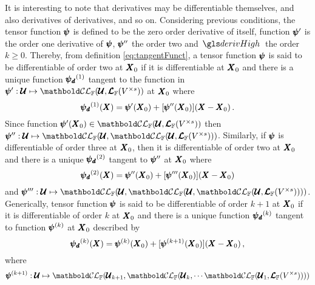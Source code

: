 It is interesting to note that derivatives may be differentiable themselves, and also derivatives of derivatives, and so on. Considering previous conditions, the tensor function $\pmb{\psi}$ is defined to be the zero order derivative of itself, function $\pmb{\psi}'$ is the order one derivative of $\pmb{\psi}$, $\pmb{\psi}''$ the order two and $\gloref{derivHigh}$ the order $k\geqslant 0$. Thereby, from definition \eqref{eq:tangentFunct}, a tensor function $\pmb{\psi}$ is said to be differentiable of order two at $\pmb{X}_0$ if it is differentiable at $\pmb{X}_0$ and there is a unique function $\pmb{\psi_\mathit{d}}^{(1)}$ tangent to the function in $\map{\tnr{\psi}'}{\pmb{\mathcal{U}}}{\evlc{\cam{F}}{\pmb{\mathcal{U}}}{\ete{\cam{F}}{V^{\times s}}}}$ at $\pmb{X}_0$ where
\begin{equation*}
\pmb{\psi_\mathit{d}}^{(1)}(\pmb{X})=\pmb{\psi}'(\pmb{X}_0)+[\pmb{\psi}''(\pmb{X}_0)](\pmb{X}-\pmb{X}_0)\,.
\end{equation*}
Since function $\fua{\tnr{\psi}'}{\tnr{X}_0}\in\evlc{\cam{F}}{\pmb{\mathcal{U}}}{\ete{\cam{F}}{V^{\times s}}}$ then  $\map{\tnr{\psi}''}{\pmb{\mathcal{U}}}{\evlc{\cam{F}}{\pmb{\mathcal{U}}}{\evlc{\cam{F}}{\pmb{\mathcal{U}}}{\ete{\cam{F}}{V^{\times s}}}}}$. Similarly, if $\pmb{\psi}$ is differentiable of order three at $\pmb{X}_0$, then it is differentiable of order two at $\pmb{X}_0$ and there is a unique $\pmb{\psi_\mathit{d}}^{(2)}$ tangent to $\pmb{\psi}''$ at $\pmb{X}_0$ where
\begin{equation*}
\pmb{\psi_\mathit{d}}^{(2)}(\pmb{X})=\pmb{\psi}''(\pmb{X}_0)+[\pmb{\psi}'''(\pmb{X}_0)](\pmb{X}-\pmb{X}_0)
\end{equation*}
and $\map{\tnr{\psi}'''}{\pmb{\mathcal{U}}}{\evlc{\cam{F}}{\pmb{\mathcal{U}}}{\evlc{\cam{F}}{\pmb{\mathcal{U}}}{\evlc{\cam{F}}{\pmb{\mathcal{U}}}{\ete{\cam{F}}{V^{\times s}}}}}}$. Generically, tensor function $\pmb{\psi}$ is said to be differentiable of order $k+1$ at $\pmb{X}_0$ if it is differentiable of order $k$ at $\pmb{X}_0$ and there is a unique function $\pmb{\psi_\mathit{d}}^{(k)}$ tangent to function $\pmb{\psi}^{(k)}$ at $\pmb{X}_0$ described by
\begin{equation}\label{eq:tangentOrderK1}
\pmb{\psi_\mathit{d}}^{(k)}(\pmb{X})=\pmb{\psi}^{(k)}(\pmb{X}_0)+[\pmb{\psi}^{(k+1)}(\pmb{X}_0)](\pmb{X}-\pmb{X}_0)\,,
\end{equation}
where
\begin{equation*}
\map{\tnr{\psi}^{(k+1)}}{\pmb{\mathcal{U}}}{{\evlc{\cam{F}}{\pmb{\mathcal{U}}_{k+1}}{\evlc{\cam{F}}{\pmb{\mathcal{U}}_k}{\cdots\evlc{\cam{F}}{\pmb{\mathcal{U}}_{1}}{\ete{\cam{F}}{V^{\times s}}}}}}}
\end{equation*}
